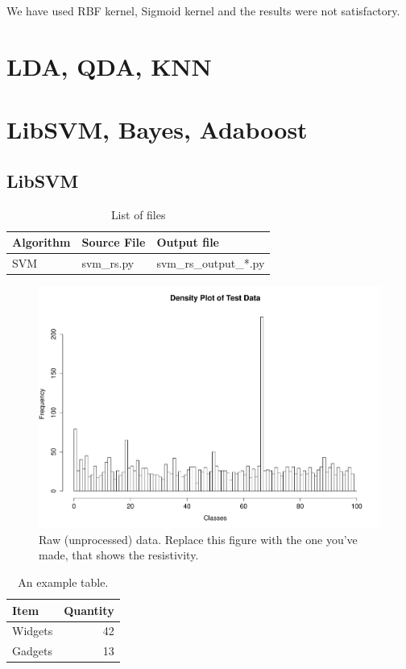 \documentclass[a4paper]{article}
\begin{document}
We have used RBF kernel, Sigmoid kernel and the results were not satisfactory.

\section{LDA, QDA, KNN}

\section{LibSVM, Bayes, Adaboost}
\subsection{LibSVM}

\begin{table}
\centering
\begin{tabular}{l|l|l}
Algorithm & Source File & Output file \\\hline
SVM & svm\_rs.py & svm\_rs\_output\_*.py \\

\end{tabular}
\caption{\label{tab:widgets}List of files}
\end{table}




\begin{figure}
\centering
\includegraphics[width=1\textwidth]{../plots/TestData_targets.pdf}
\caption{\label{fig:data}Raw (unprocessed) data. Replace this figure with the one you've made, that shows the resistivity.}
\end{figure}

\begin{table}
\centering
\begin{tabular}{l|r}
Item & Quantity \\\hline
Widgets & 42 \\
Gadgets & 13
\end{tabular}
\caption{\label{tab:widgets}An example table.}
\end{table}
\end{document}

